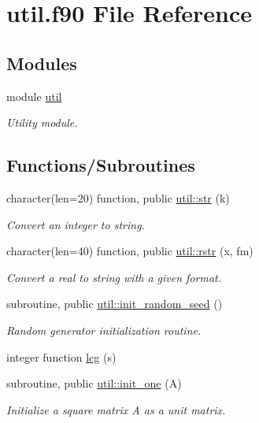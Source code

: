 \hypertarget{util_8f90}{}\section{util.\+f90 File Reference}
\label{util_8f90}
\subsection*{Modules}
\begin{DoxyCompactItemize}
\item 
module \hyperlink{namespaceutil}{util}
\begin{DoxyCompactList}\small\item\em Utility module. \end{DoxyCompactList}\end{DoxyCompactItemize}
\subsection*{Functions/\+Subroutines}
\begin{DoxyCompactItemize}
\item 
character(len=20) function, public \hyperlink{namespaceutil_a1df36d0696c9183ceb6bb770f1d88111}{util\+::str} (k)
\begin{DoxyCompactList}\small\item\em Convert an integer to string. \end{DoxyCompactList}\item 
character(len=40) function, public \hyperlink{namespaceutil_ac1630658a46867b1f7255eaa51198bf3}{util\+::rstr} (x, fm)
\begin{DoxyCompactList}\small\item\em Convert a real to string with a given format. \end{DoxyCompactList}\item 
subroutine, public \hyperlink{namespaceutil_a3c2dcf05b068a55f0066d2b393e75dc7}{util\+::init\+\_\+random\+\_\+seed} ()
\begin{DoxyCompactList}\small\item\em Random generator initialization routine. \end{DoxyCompactList}\item 
integer function \hyperlink{util_8f90_a669ac8da4cdd11efd16a0ef72a4f7915}{lcg} (s)
\item 
subroutine, public \hyperlink{namespaceutil_aca7f2465fedb87fef954d8f0c30668c7}{util\+::init\+\_\+one} (A)
\begin{DoxyCompactList}\small\item\em Initialize a square matrix A as a unit matrix. \end{DoxyCompactList}\end{DoxyCompactItemize}


